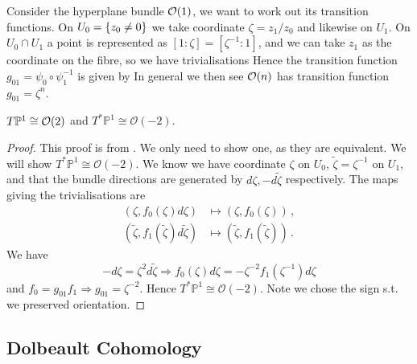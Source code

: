 \documentclass{article}
\begin{document}
\begin{example}
	Consider the hyperplane bundle $\mathcal{O}(1)$, we want to work out its transition functions. On $U_0 = \left\{ z_0 \neq 0 \right\}$ we take coordinate $\zeta = z_1/z_0$ and likewise on $U_1$. On $U_0 \cap U_1$ a point is represented as $[1:\zeta]=[\zeta^{-1}:1]$, and we can take $z_1$ as the coordinate on the fibre, so we have trivialisations
Hence the transition function $g_{01}=\psi_0 \circ \psi_1^{-1}$ is given by 
In general we then see $\mathcal{O}(n)$ has transition function $g_{01}=\zeta^{n}$. 
\end{example}

\begin{prop}
	$T\mathbb{P}^1 \cong \mathcal{O}(2)$ and $T^\ast \mathbb{P}^1 \cong \mathcal{O}(-2)$. 
\end{prop}
\begin{proof}
	This proof is from \cite{Hitchin1999}. We only need to show one, as they are equivalent. We will show $T^\ast \mathbb{P}^1 \cong \mathcal{O}(-2)$. We know we have coordinate $\zeta$ on $U_0$, $\tilde{\zeta} = \zeta^{-1}$ on $U_1$, and that the bundle directions are generated by $d\zeta, -d\tilde{\zeta}$ respectively. The maps giving the trivialisations are 
	\begin{align*}
	(\zeta, f_0(\zeta)d\zeta) &\mapsto (\zeta, f_0(\zeta)) \, , \\
	(\tilde{\zeta}, f_1(\tilde{\zeta})d\tilde{\zeta}) &\mapsto (\tilde{\zeta}, f_1(\tilde{\zeta})) \, . 	
	\end{align*}
    We have 
    \[
    -d\zeta = \zeta^{2}d\tilde{\zeta} \Rightarrow f_0(\zeta)d\zeta = -\zeta^{-2}f_1(\zeta^{-1}) d\zeta 
    \]
    and $f_0 = g_{01}f_1 \Rightarrow g_{01} = \zeta^{-2}$. Hence $T^\ast \mathbb{P}^1 \cong \mathcal{O}(-2)$. Note we chose the sign s.t. we preserved orientation. 
\end{proof}

\subsection{Dolbeault Cohomology}
\end{document}
